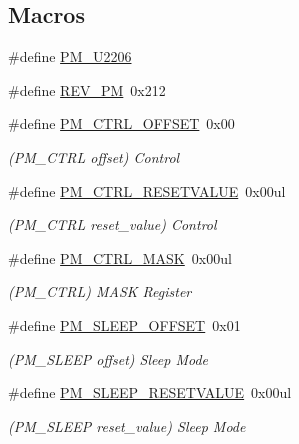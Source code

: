 \subsection*{Macros}
\begin{DoxyCompactItemize}
\item 
\#define \mbox{\hyperlink{group___s_a_m_d21___p_m_gad742c3c299a198b33dde4f8fbee7d21c}{P\+M\+\_\+\+U2206}}
\item 
\#define \mbox{\hyperlink{group___s_a_m_d21___p_m_ga575500b9d7813503f74cc639dac37705}{R\+E\+V\+\_\+\+PM}}~0x212
\item 
\#define \mbox{\hyperlink{group___s_a_m_d21___p_m_gabecd64dad184eeecf687588d9fa03a24}{P\+M\+\_\+\+C\+T\+R\+L\+\_\+\+O\+F\+F\+S\+ET}}~0x00
\begin{DoxyCompactList}\small\item\em (P\+M\+\_\+\+C\+T\+RL offset) Control \end{DoxyCompactList}\item 
\#define \mbox{\hyperlink{group___s_a_m_d21___p_m_ga549cafdd7557cf5d221d6ebb1a67f5c6}{P\+M\+\_\+\+C\+T\+R\+L\+\_\+\+R\+E\+S\+E\+T\+V\+A\+L\+UE}}~0x00ul
\begin{DoxyCompactList}\small\item\em (P\+M\+\_\+\+C\+T\+RL reset\+\_\+value) Control \end{DoxyCompactList}\item 
\#define \mbox{\hyperlink{group___s_a_m_d21___p_m_ga14c17f7ebe9d3b16c6e23dd1395e26ed}{P\+M\+\_\+\+C\+T\+R\+L\+\_\+\+M\+A\+SK}}~0x00ul
\begin{DoxyCompactList}\small\item\em (P\+M\+\_\+\+C\+T\+RL) M\+A\+SK Register \end{DoxyCompactList}\item 
\#define \mbox{\hyperlink{group___s_a_m_d21___p_m_gaa85ab2023c40ebc25f0620612fafe86d}{P\+M\+\_\+\+S\+L\+E\+E\+P\+\_\+\+O\+F\+F\+S\+ET}}~0x01
\begin{DoxyCompactList}\small\item\em (P\+M\+\_\+\+S\+L\+E\+EP offset) Sleep Mode \end{DoxyCompactList}\item 
\#define \mbox{\hyperlink{group___s_a_m_d21___p_m_ga3ff3c820932d9494e44f36d714fa4f67}{P\+M\+\_\+\+S\+L\+E\+E\+P\+\_\+\+R\+E\+S\+E\+T\+V\+A\+L\+UE}}~0x00ul
\begin{DoxyCompactList}\small\item\em (P\+M\+\_\+\+S\+L\+E\+EP reset\+\_\+value) Sleep Mode \end{DoxyCompactList}\item 

\end{DoxyCompactItemize}
